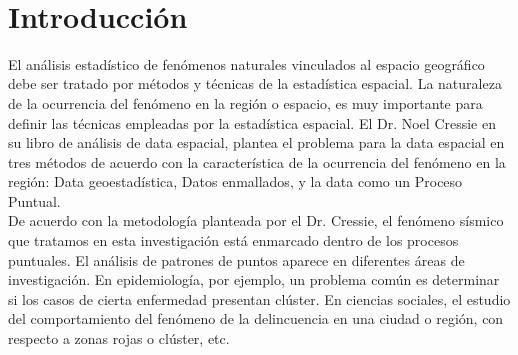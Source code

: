 \documentclass[12pt]{report}
\begin{document}
	
	
	
	
	
	\setcounter{page}{1}
	\pagestyle{plain}
	
	
	
	
	\thispagestyle{empty}~~\vspace{-0.2cm}
	
	
	\newpage		
	
	\tableofcontents
	\newpage
	\listoftables
	\newpage 
	\listoffigures
	\newpage
	
	
	
	

	






\newpage


	\chapter*{Introducción } 	
	
 El análisis estadístico de fenómenos naturales vinculados al espacio geográfico debe ser tratado por métodos y técnicas de la estadística espacial. La naturaleza de la ocurrencia del fenómeno en la región o espacio, es muy importante para definir las técnicas empleadas por la estadística espacial. El Dr. Noel Cressie \cite{Cress} en su libro de análisis de data espacial, plantea el problema para la data espacial en tres métodos de acuerdo con la característica de la ocurrencia del fenómeno en la región: Data geoestadística, Datos enmallados, y la data como un Proceso Puntual. \\



 De acuerdo con la metodología planteada por el Dr. Cressie, el fenómeno sísmico que tratamos en esta investigación está enmarcado dentro de los procesos puntuales. El análisis de patrones de puntos aparece en diferentes áreas de investigación. En epidemiología, por ejemplo,  un problema común es determinar si los casos de cierta enfermedad presentan clúster. En ciencias sociales, el estudio del comportamiento del fenómeno de la delincuencia en una ciudad o región, con respecto a zonas rojas o clúster, etc. \\
\end{document}
